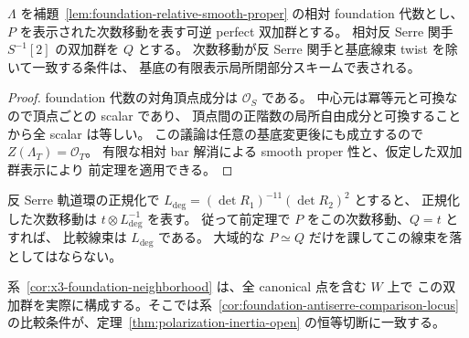 \begin{corollary}
\label{cor:foundation-antiserre-comparison-locus}
$\Lambda$ を補題~\ref{lem:foundation-relative-smooth-proper} の相対 foundation 代数とし、
$P$ を表示された次数移動を表す可逆 perfect 双加群とする。
相対反 Serre 関手 $S^{-1}[2]$ の双加群を $Q$ とする。
次数移動が反 Serre 関手と基底線束 twist を除いて一致する条件は、
基底の有限表示局所閉部分スキームで表される。
\end{corollary}
\begin{proof}
foundation 代数の対角頂点成分は $\mathcal O_S$ である。
中心元は冪等元と可換なので頂点ごとの scalar であり、
頂点間の正階数の局所自由成分と可換することから全 scalar は等しい。
この議論は任意の基底変更後にも成立するので $Z(\Lambda_T)=\mathcal O_T$。
有限な相対 bar 解消による smooth proper 性と、仮定した双加群表示により
前定理を適用できる。
\end{proof}

\begin{remark}[次数の正規化と適用範囲]
反 Serre 軌道環の正規化で
$L_{\mathrm{deg}}=(\det R_1)^{-11}(\det R_2)^2$ とすると、
正規化した次数移動は $t\otimes L_{\mathrm{deg}}^{-1}$ を表す。
従って前定理で $P$ をこの次数移動、$Q=t$ とすれば、
比較線束は $L_{\mathrm{deg}}$ である。
大域的な $P\simeq Q$ だけを課してこの線束を落としてはならない。

系~\ref{cor:x3-foundation-neighborhood} は、全 canonical 点を含む $W$ 上で
この双加群を実際に構成する。そこでは系~\ref{cor:foundation-antiserre-comparison-locus}
の比較条件が、定理~\ref{thm:polarization-inertia-open} の恒等切断に一致する。
\end{remark}
